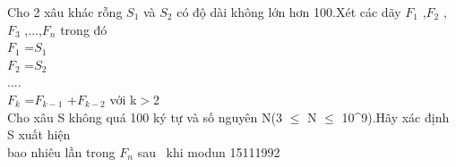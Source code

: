 Cho 2 xâu khác rỗng $S_{1}$   và $S_{2}$   có độ dài không lớn hơn 100.Xét các dãy $F_{1}$   ,$F_{2}$   ,$F_{3}$   ,...,$F_{n}$   trong đó   
\\   $F_{1}$   =$S_{1}$
\\   $F_{2}$   =$S_{2}$
\\   ....   
\\   $F_{k}$   =$F_{k-1}$   +$F_{k-2}$   với k$>$2   
\\   Cho xâu S không quá 100 ký tự và số nguyên N(3 $\le$ N $\le$ 10^9).Hãy xác định S xuất hiện   
\\   bao nhiêu lần trong $F_{n}$   sau  khi modun 15111992   
\\
\\
\\